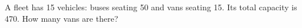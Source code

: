 A fleet has 15 vehicles: buses seating 50 and vans seating 15. Its total capacity is 470. How many vans are there?
